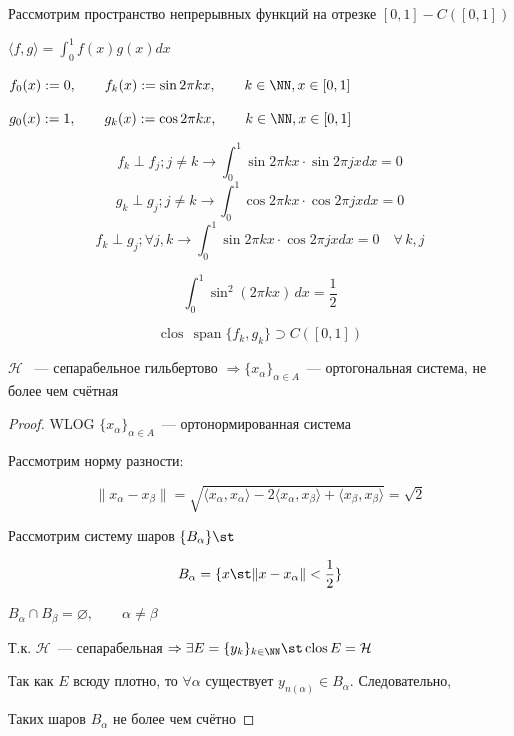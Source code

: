 \begin{Example}{}{}
	Рассмотрим пространство непрерывных функций на отрезке $[0, 1] - C([0, 1])$
	
	$ \langle f, g \rangle  = \int^1_0 f(x)g(x)dx$
	
	$f_0(x) := 0, \qquad f_k(x) := \sin{2\pi kx}, \qquad k \in \NN,  x \in [0, 1]$
	
	$g_0(x) := 1, \qquad g_k(x) := \cos{2\pi kx}, \qquad k \in \NN,  x \in [0, 1]$
	
	\[ f_k \perp f_j; j \neq k \rightarrow \int^1_0 \sin{2\pi kx} \cdot \sin{2\pi jx}dx = 0 \]
	\[ g_k \perp g_j; j \neq k \rightarrow \int^1_0 \cos{2\pi kx} \cdot \cos{2\pi jx}dx = 0 \] 
	\[ f_k \perp g_j; \forall  j, k \rightarrow \int^1_0 \sin{2\pi kx} \cdot \cos{2\pi jx}dx = 0  \quad \forall \, k, j \]
	
	\[ \int_0^1 \sin^2(2\pi kx)\,dx = \frac{1}{2} \]
	
	\[ \operatorname{clos}\,\operatorname{span}\{f_k,g_k\} \supset C([0, 1]) \]
\end{Example}

\begin{Proposition}{}{}
	$\mathcal{H}$ ~--- сепарабельное гильбертово $\Rightarrow \{x_\alpha\}_{\alpha \in A}$~--- ортогональная система, не более чем счётная 
\end{Proposition}

\begin{proof}
	
	WLOG $\{x_\alpha\}_{\alpha \in A}$~--- ортонормированная система
	
	Рассмотрим норму разности:
	
	\[  \|x_\alpha - x_\beta\|  = \sqrt{ \langle x_\alpha, x_\alpha \rangle  - 2 \langle x_\alpha, x_\beta \rangle  +  \langle x_\beta, x_\beta \rangle } = \sqrt{2} \]
	
	Рассмотрим систему шаров $\{ B_\alpha \} \st$
	
	\[ B_\alpha = \{ x \st  \|x - x_\alpha\|   <  \frac{1}{2} \}\]
	
	$B_\alpha \cap B_\beta = \varnothing, \qquad \alpha \neq \beta$
	
	Т.к. $\mathcal{H}$~--- сепарабельная $\Rightarrow  \exists  E = \{ y_k \}_{k \in \NN} \st \operatorname{clos} E =  \mathcal{H}$
	
	Так как $E$ всюду плотно, то $\forall \alpha$ существует $y_{n(\alpha)} \in B_\alpha$. Следовательно,
	
	Таких шаров $B_\alpha$ не более чем счётно
\end{proof}

